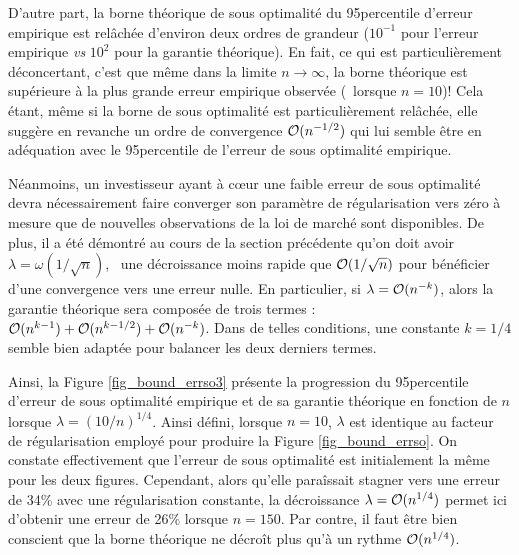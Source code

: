 D'autre part, la borne théorique de sous optimalité du 95\ieme percentile d'erreur
empirique est relâchée d'environ deux ordres de grandeur ($10^{-1}$ pour l'erreur
empirique \textit{vs} $10^{2}$ pour la garantie théorique). En fait, ce qui est
particulièrement déconcertant, c'est que même dans la limite $n\to\infty$, la borne théorique est
supérieure à la plus grande erreur empirique observée (\ie\ lorsque $n=10$)!  Cela étant, même si la borne de sous optimalité est particulièrement
relâchée, elle suggère en revanche un ordre de convergence $\mathcal O(n^{-1/2})$ qui lui
semble être en adéquation avec le 95\ieme percentile de l'erreur de sous optimalité
empirique.

Néanmoins, un investisseur ayant à cœur une faible erreur de sous optimalité devra
nécessairement faire converger son paramètre de régularisation vers zéro à mesure que de
nouvelles observations de la loi de marché sont disponibles. De plus, il a été démontré au
cours de la section précédente qu'on doit avoir $\lambda = \omega(1/\sqrt{n})$, \ie\ une décroissance
moins rapide que $\mathcal O(1/\sqrt{n})$ pour bénéficier d'une convergence vers une erreur
nulle. En particulier, si $\lambda = \mathcal O(n^{-k})$, alors la garantie théorique sera composée
de trois termes : $\mathcal O(n^{k-1}) + \mathcal O(n^{k-1/2}) + \mathcal O(n^{-k})$. Dans de telles
conditions, une constante $k=1/4$ semble bien adaptée pour balancer les deux derniers
termes.

Ainsi, la Figure \ref{fig_bound_errso3} présente la progression du 95\ieme percentile
d'erreur de sous optimalité empirique et de sa garantie théorique en fonction de $n$
lorsque $\lambda=(10/n)^{1/4}$. Ainsi défini, lorsque $n=10$, $\lambda$ est identique au facteur de
régularisation employé pour produire la Figure \ref{fig_bound_errso}. On constate
effectivement que l'erreur de sous optimalité est initialement la même pour les deux
figures. Cependant, alors qu'elle paraîssait stagner vers une erreur de 34\% avec une
régularisation constante, la décroissance $\lambda = \mathcal O(n^{1/4})$ permet ici d'obtenir une
erreur de 26\% lorsque $n=150$. Par contre, il faut être bien conscient que la borne
théorique ne décroît plus qu'à un rythme $\mathcal O(n^{1/4})$.

\newpage

